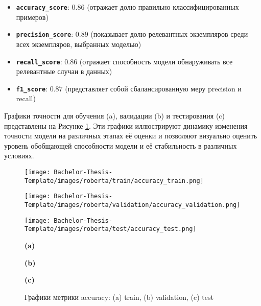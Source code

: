 \begin{itemize}
    \item \textbf{\texttt{accuracy\_score}}: $0.86$ (отражает долю правильно классифицированных примеров)
    
    \item \textbf{\texttt{precision\_score}}: $0.89$ (показывает долю релевантных экземпляров среди всех экземпляров, выбранных моделью)
    
    \item \textbf{\texttt{recall\_score}}: $0.86$ (отражает способность модели обнаруживать все релевантные случаи в данных)
    
    \item \textbf{\texttt{f1\_score}}: $0.87$ (представляет собой сбалансированную меру precision и recall)
\end{itemize}

Графики точности для обучения (a), валидации (b) и тестирования (c) представлены на Рисунке \ref{fig:roberta_accuracy}. Эти графики иллюстрируют динамику изменения точности модели на различных этапах её оценки и позволяют визуально оценить уровень обобщающей способности модели и её стабильность в различных условиях.


\begin{figure}[h]
    \begin{minipage}{0.33\textwidth}
        \centering
        \texttt{[image: Bachelor-Thesis-Template/images/roberta/train/accuracy\_train.png]}
    \end{minipage}%
    \begin{minipage}{0.33\textwidth}
        \centering
        \texttt{[image: Bachelor-Thesis-Template/images/roberta/validation/accuracy\_validation.png]}
    \end{minipage}%
    \begin{minipage}{0.33\textwidth}
        \centering
        \texttt{[image: Bachelor-Thesis-Template/images/roberta/test/accuracy\_test.png]}
    \end{minipage}%

    \newline
    \begin{minipage}{0.33\textwidth}
      \centering
    \textbf{(a)}
    \end{minipage}%
    \begin{minipage}{0.33\textwidth}
    \centering
    \textbf{(b)}
    \end{minipage}%
    \begin{minipage}{0.33\textwidth}
    \centering
    \textbf{(c)}
    \end{minipage}%
    
    \caption{\small Графики метрики accuracy: (a) train, (b) validation, (c) test}
    \label{fig:roberta_accuracy}
\end{figure}

